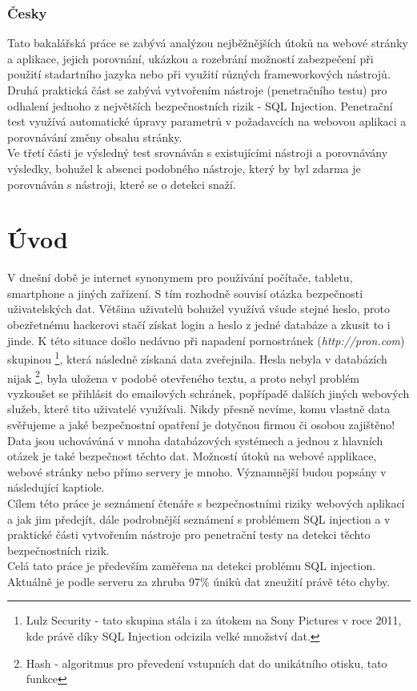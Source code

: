 \documentclass[12pt, a4paper]{report}
\begin{document}
\subsection*{Česky}
Tato bakalářská práce se zabývá analýzou nejběžnějších útoků na webové stránky a aplikace, jejich porovnání, ukázkou a rozebrání možností zabezpečení při použití stadartního jazyka nebo při využití různých frameworkových nástrojů.\\
Druhá praktická část se zabývá vytvořením nástroje (penetračního testu) pro odhalení jednoho z největších bezpečnostních rizik - SQL Injection. Penetrační test využívá automatické úpravy parametrů v požadavcích na webovou aplikaci a porovnávání změny obsahu stránky.\\
Ve třetí části je výsledný test srovnáván s existujícími nástroji a porovnávány výsledky, bohužel k absenci podobného nástroje, který by byl zdarma je porovnáván s  nástroji, které se o detekci snaží.



\chapter{Úvod}
V dnešní době je internet synonymem pro používání počítače, tabletu, smartphone a jiných zařízení. S tím rozhodně souvisí otázka bezpečnosti uživatelských dat. Většina uživatelů bohužel využívá všude stejné heslo, proto obezřetnému hackerovi stačí získat login a heslo z jedné databáze a zkusit to i jinde. K této situace došlo nedávno při napadení pornostránek (\textit{http://pron.com}) skupinou \footnote{Lulz Security - tato skupina stála i za útokem na Sony Pictures v roce 2011, kde právě díky SQL Injection odcizila velké množství dat.}, která následně získaná data zveřejnila. Hesla nebyla v databázích nijak \footnote{Hash - algoritmus pro převedení vstupních dat do unikátního otisku, tato funkce }, byla uložena v podobě otevřeného textu, a proto nebyl problém vyzkoušet se přihlásit do emailových schránek, popřípadě dalších jiných webových služeb, které tito uživatelé využívali. Nikdy přesně nevíme, komu vlastně data svěřujeme a jaké bezpečnostní opatření je dotyčnou firmou či osobou zajištěno! Data jsou uchováváná v mnoha databázových systémech a jednou z hlavních otázek je také bezpečnost těchto dat. Možností útoků na webové applikace, webové stránky nebo přímo servery je mnoho. Významnější budou popsány v následující kaptiole.\\
Cílem této práce je seznámení čtenáře s bezpečnostními riziky webových aplikací a jak jim předejít, dále podrobnější seznámení s problémem SQL injection a v praktické části vytvořením nástroje pro penetrační testy na detekci těchto bezpečnostních rizik.\\
Celá tato práce je především zaměřena na detekci problému SQL injection. Aktuálně je podle serveru  za zhruba 97\% úniků dat zneužití právě této chyby. 
\end{document}
